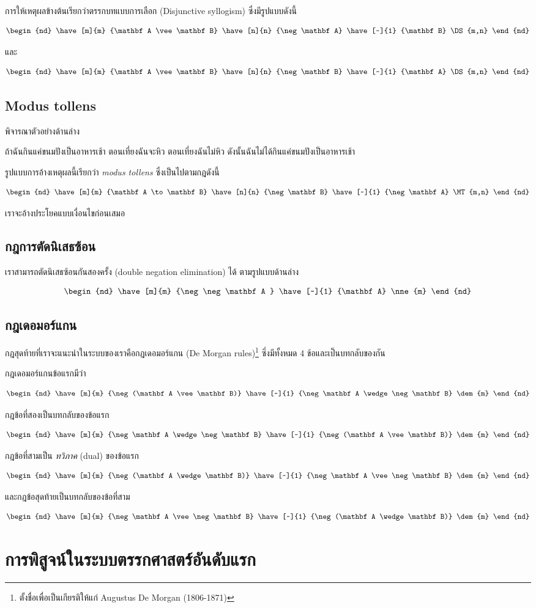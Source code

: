 \documentclass[a4paper,12pt]{extbook}
\theoremstyle{definition}
\theoremstyle{remark}
\newcommand{\fitch}[1]{
	
\begin{minipage}[l]{0.5in}%
		\begin{equation*}%
		\begin{nd}%
		#1	%
		\end{nd}%
		\end{equation*}%
		\vspace{0pt}%
\end{minipage}%

}
\newcommand{\boxthis}[1]{
	\begin{textbox}%
		#1 
	\end{textbox}%
}
\begin{document}
		การให้เหตุผลข้างต้นเรียกว่าตรรกบทแบบการเลือก (Disjunctive syllogism) ซึ่งมีรูปแบบดังนี้
		\boxthis{\fitch{
			\have[m]{m}		{\mathbf A \vee\mathbf B}
			\have[n]{n}		{\neg\mathbf A}
			\have[~]{1}		{\mathbf B}		\DS{m,n}
		}}
		และ
		\boxthis{\fitch{
				\have[m]{m}		{\mathbf A \vee\mathbf B}
				\have[n]{n}		{\neg\mathbf B}
				\have[~]{1}		{\mathbf A}		\DS{m,n}
		}}
		\section{Modus tollens}
			พิจารณาตัวอย่างด้านล่าง
		\begin{center}
			ถ้าฉันกินแค่ขนมปังเป็นอาหารเช้า	ตอนเที่ยงฉันจะหิว	ตอนเที่ยงฉันไม่หิว ดังนั้นฉันไม่ได้กินแค่ขนมปังเป็นอาหารเช้า
		\end{center}
		รูปแบบการอ้างเหตุผลนี้เรียกว่า \textit{modus tollens} ซึ่งเป็นไปตามกฎดังนี้
		\boxthis{\fitch{
				\have[m]{m}		{\mathbf A \to\mathbf B}
				\have[n]{n}		{\neg\mathbf B}
				\have[~]{1}		{\neg\mathbf A}		\MT{m,n}
		}}
		เราจะอ้างประโยคแบบเงื่อนไขก่อนเสมอ
		\section{กฎการตัดนิเสธซ้อน}
		เราสามารถตัดนิเสธซ้อนกันสองครั้ง (double negation elimination) ได้ ตามรูปแบบด้านล่าง
		\boxthis{\fitch{
				\have[m]{m}		{\neg\neg\mathbf A }
				\have[~]{1}		{\mathbf A}		\nne{m}
		}}
		\section{กฎเดอมอร์แกน}
		กฎสุดท้ายที่เราจะแนะนำในระบบของเราคือกฎเดอมอร์แกน (De Morgan rules)\footnote{ตั้งชื่อเพื่อเป็นเกียรติให้แก่ Augustus De Morgan (1806-1871)} ซึ่งมีทั้งหมด 4 ข้อและเป็นบทกลับของกัน
		
		กฎเดอมอร์แกนข้อแรกมีว่า
		\boxthis{\fitch{
				\have[m]{m}		{\neg(\mathbf A \vee\mathbf B)}
				\have[~]{1}		{\neg\mathbf A \wedge \neg\mathbf B}		\dem{m}
		}}
	 	กฎข้อที่สองเป็นบทกลับของข้อแรก
		 \boxthis{\fitch{
		 		\have[m]{m}		{\neg\mathbf A \wedge \neg\mathbf B}
		 		\have[~]{1}		{\neg(\mathbf A \vee\mathbf B)}		\dem{m}
		 }}
	 	กฎข้อที่สามเป็น \textit{ทวิภาค} (dual) ของข้อแรก
		\boxthis{\fitch{
		\have[m]{m}		{\neg(\mathbf A \wedge\mathbf B)}
		\have[~]{1}		{\neg\mathbf A \vee \neg\mathbf B}		\dem{m}
		}}
		และกฎข้อสุดท้ายเป็นบทกลับของข้อที่สาม
		\boxthis{\fitch{
				\have[m]{m}		{\neg\mathbf A \vee \neg\mathbf B}
				\have[~]{1}		{\neg(\mathbf A \wedge\mathbf B)}		\dem{m}
		}}
	\chapter{การพิสูจน์ในระบบตรรกศาสตร์อันดับแรก}
	
\end{document}
